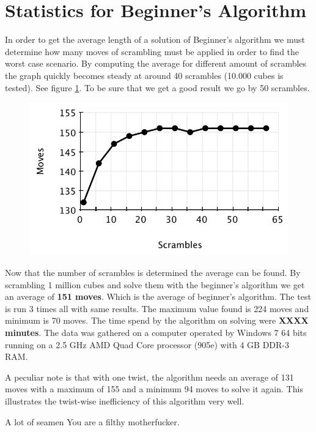 \section{Statistics for Beginner's Algorithm}
\label{sec:beginnersStat}
In order to get the average length of a solution of Beginner's algorithm we must determine how many moves of scrambling must be applied in order to find the worst case scenario. 
By computing the average for different amount of scrambles the graph quickly becomes steady at around 40 scrambles (10.000 cubes is tested). See figure \ref{fig:beginnersScramble}. To be sure that we get a good result we go by 50 scrambles.
\begin{figure}[htbp]
	\centering
		\includegraphics{input/pics/beginnersScramble.pdf}
	\caption{}
	\label{fig:beginnersScramble}
\end{figure}

Now that the number of scrambles is determined the average can be found.
By scrambling 1 million cubes and solve them with the beginner's algorithm we get an average of \textbf{151 moves}. 
Which is the average of beginner's algorithm. The test is run 3 times all with same results.
The maximum value found is 224 moves and minimum is 70 moves. 
The time spend by the algorithm on solving were \textbf{XXXX minutes}. 
The data was gathered on a computer operated by Windows 7 64 bits running on a 2.5 GHz AMD Quad Core processor (905e) with 4 GB DDR-3 RAM.

A peculiar note is that with one twist, the algorithm needs an average of 131 moves with a maximum of 155 and a minimum 94 moves to solve it again.
This illustrates the twist-wise inefficiency of this algorithm very well.


A lot of seamen You are a filthy motherfucker.